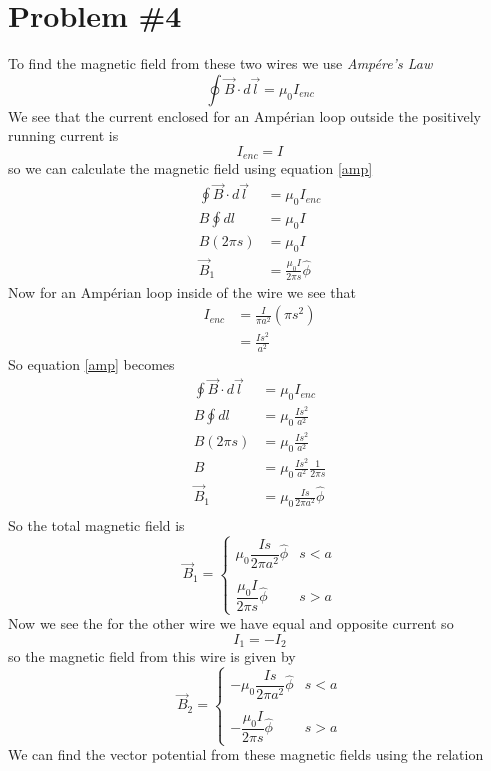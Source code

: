\documentclass[11pt]{article}
\numberwithin{equation}{section}
\begin{document}
\section{Problem \#4}
To find the magnetic field from these two wires we use \emph{Amp\'{e}re's Law}
\begin{equation}
\oint\vec{B}\cdot d\vec{l} = \mu_0I_{enc}
\label{amp}
\end{equation}
We see that the current enclosed for an Amp\'{e}rian loop outside the positively running current is
$$I_{enc} = I$$
so we can calculate the magnetic field using equation \ref{amp}
\begin{align*}
\oint\vec{B}\cdot d\vec{l} &= \mu_0I_{enc}\\
B\oint dl &= \mu_0I\\
B(2\pi s) &= \mu_0I\\
\vec{B}_1 &= \frac{\mu_0I}{2\pi s}\hat{\phi}
\end{align*}
Now for an Amp\'{e}rian loop inside of the wire we see that
\begin{align*}
I_{enc} &= \frac{I}{\pi a^2}(\pi s^2)\\
&= \frac{Is^2}{a^2}
\end{align*}
So equation \ref{amp} becomes
\begin{align*}
\oint\vec{B}\cdot d\vec{l} &= \mu_0I_{enc}\\
B\oint dl &= \mu_0\frac{Is^2}{a^2}\\
B(2\pi s) &= \mu_0\frac{Is^2}{a^2}\\
B &= \mu_0\frac{Is^2}{a^2}\frac{1}{2\pi s}\\
\vec{B}_1 &= \mu_0\frac{Is}{2\pi a^2}\hat{\phi}\\
\end{align*}
So the total magnetic field is 
$$\vec{B}_1 = \left\{\begin{array}{lc}
	\mu_0\dfrac{Is}{2\pi a^2}\hat{\phi}		&s<a\\
\\
	\dfrac{\mu_0I}{2\pi s}\hat{\phi}		&s>a
		\end{array}\right.$$
Now we see the for the other wire we have equal and opposite current so
$$I_1 = -I_2$$ 
so the magnetic field from this wire is given by
$$\vec{B}_2 = \left\{\begin{array}{lc}
	-\mu_0\dfrac{Is}{2\pi a^2}\hat{\phi}		&s<a\\
\\
	-\dfrac{\mu_0I}{2\pi s}\hat{\phi}	&s>a
		\end{array}\right.$$
We can find the vector potential from these magnetic fields using the relation
\end{document}

